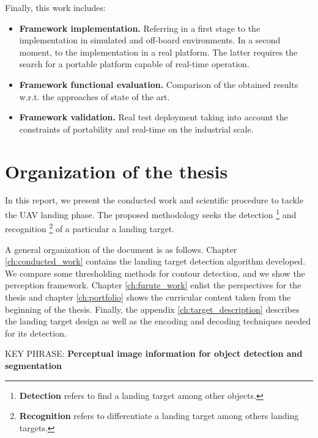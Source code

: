 Finally, this work includes:  

\begin{itemize}
 \item \textbf{Framework implementation.} Referring in a first stage to the implementation in simulated and off-board environments. In a second moment, to the implementation in a real platform. The latter requires the search for a portable platform capable of real-time operation.
 
 \item \textbf{Framework functional evaluation.} Comparison of the obtained results w.r.t. the approaches of state of the art.
 
 \item \textbf{Framework validation.} Real test deployment taking into account the constraints of portability and real-time on the industrial scale.
 
\end{itemize}

\section{Organization of the thesis}
In this report, we present the conducted work and scientific procedure to tackle the UAV landing phase. The proposed methodology seeks the detection \footnote{\textbf{Detection} refers to find a landing target among other objects.} and recognition \footnote{\textbf{Recognition} refers to differentiate a landing target among others landing targets.} of a particular a landing target. 

A general organization of the document is as follows. Chapter \ref{ch:conducted_work} contains the landing target detection algorithm developed. We compare some thresholding methods for contour detection, and we show the perception framework. Chapter \ref{ch:furute_work} enlist the perspectives for the thesis and chapter \ref{ch:portfolio} shows the curricular content taken from the beginning of the thesis. Finally, the appendix \ref{ch:target_description} describes the landing target design as well as the encoding and decoding techniques needed for its detection.

KEY PHRASE: \textbf{Perceptual image information for object detection and segmentation}



